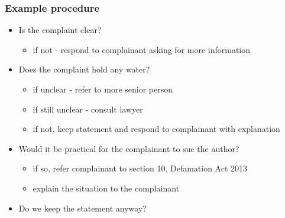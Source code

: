 \documentclass[ignorenonframetext,]{beamer}
\begin{document}
\begin{frame}
  \frametitle{Example procedure}
  \begin{itemize}
  \item Is the complaint clear?
    \begin{itemize}
    \item if not - respond to complainant asking for more information
    \end{itemize}
  \item Does the complaint hold any water?
    \begin{itemize}
    \item if unclear - refer to more senior person
    \item if still unclear - consult lawyer
    \item if not, keep statement and respond to complainant with explanation
    \end{itemize}
  \item Would it be practical for the complainant to sue the author?
    \begin{itemize}
    \item if so, refer complainant to section 10, Defamation Act 2013
    \item explain the situation to the complainant
    \end{itemize}
  \item Do we keep the statement anyway?
  \end{itemize}

\end{frame}
\end{document}
